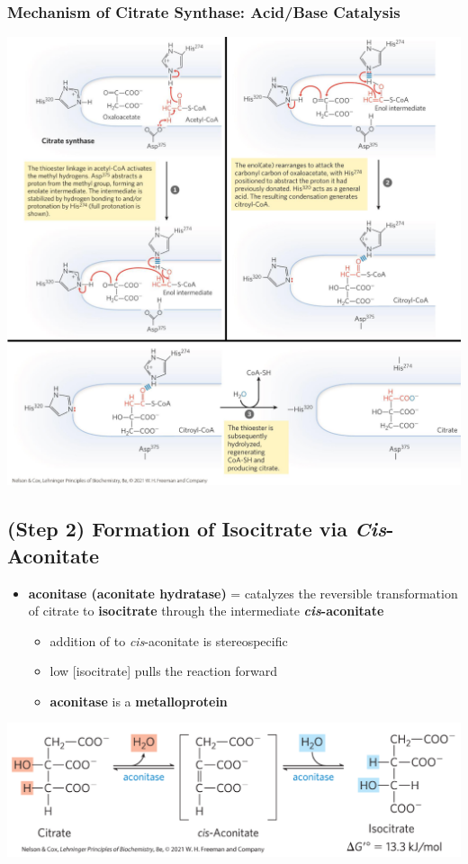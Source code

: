 \documentclass[10pt]{article}
\newcommand{\water}{\text{H$_2$O}}
\begin{document}
\subsubsection*{Mechanism of Citrate Synthase: Acid/Base Catalysis}
\begin{center} 
	\includegraphics*[width=\textwidth]{L4_3.png}
\end{center}

\subsection*{(Step 2) Formation of Isocitrate via \textit{Cis}-Aconitate}
\begin{itemize}
	\item \textbf{aconitase (aconitate hydratase)} = catalyzes the reversible transformation of citrate to \textbf{isocitrate} through the intermediate \textbf{\textit{cis}-aconitate}
	\begin{itemize}
        \item addition of \water to \textit{cis}-aconitate is stereospecific
        \item low [isocitrate] pulls the reaction forward
        \item \textbf{aconitase} is a \textbf{metalloprotein}
    \end{itemize}
\end{itemize}
\begin{center} 
	\includegraphics*[width=\textwidth]{L4_4.png} 
\end{center}
\end{document}
